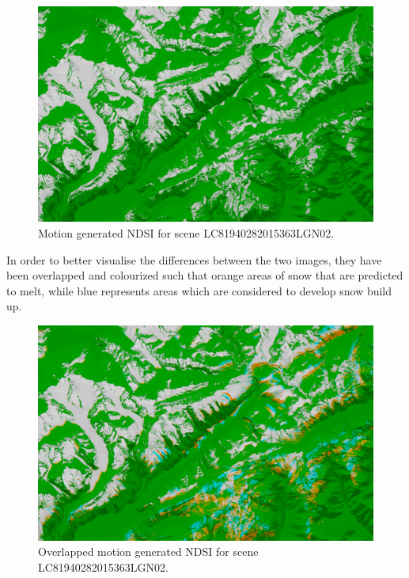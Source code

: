\documentclass[12pt, a4paper]{report}
\begin{document}
	\begin{figure}[h!]
	\centering
	\includegraphics[width=\linewidth]{../images/LC81940282015363LGN02_motion_predicted.png}
	\caption{Motion generated NDSI for scene LC81940282015363LGN02.}
	\label{fig:motion_predicted_image}
	\end{figure}

	In order to better visualise the differences between the two images, they have been overlapped and colourized such that orange areas of snow that are predicted to melt, while blue represents areas which are considered to develop snow build up.
	
	\begin{figure}[h!]
		\centering
		\includegraphics[width=\linewidth]{../images/LC81940282015363LGN02_motion_predicted_overlay.png}
		\caption{Overlapped motion generated NDSI for scene LC81940282015363LGN02.}
		\label{fig:overlapped_motion_predicted_image}
	\end{figure}
\end{document}
